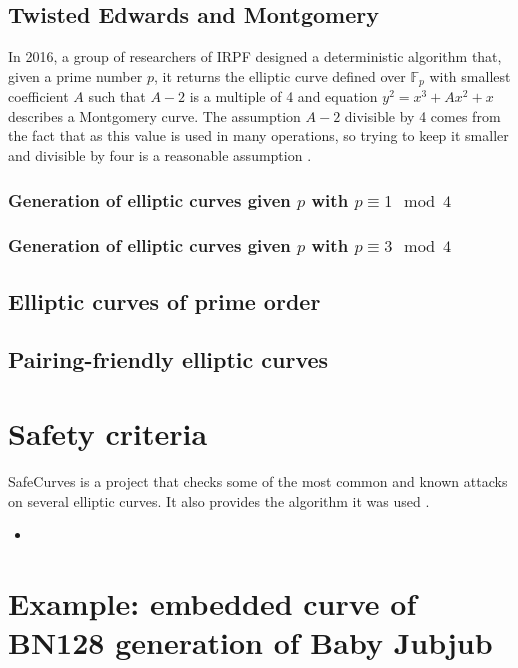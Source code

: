\documentclass{article}
\newcommand{\Fp}{\ensuremath{\mathbb{F}_p}}
\begin{document}
\begin{spacing}{1.2}
	\subsection{Twisted Edwards and Montgomery}
				
		In 2016, a group of researchers of IRPF designed a deterministic algorithm that, given a prime number $p$, it returns the elliptic curve defined over $\Fp$ with smallest coefficient $A$ such that $A-2$ is a multiple of 4 and equation $y^2 = x^3 + Ax^2 + x$ describes a Montgomery curve. 
		The assumption $A-2$ divisible by 4 comes from the fact that as this value is used in many operations, so trying to keep it smaller and divisible by four is a reasonable assumption \cite{generation-baby}.
		
		\subsubsection{Generation of elliptic curves given $p$ with $p\equiv1\mod4$} \vspace{0.5cm}
				
		\subsubsection{Generation of elliptic curves given $p$ with $p\equiv3\mod4$}
		
	\subsection{Elliptic curves of prime order}
	\subsection{Pairing-friendly elliptic curves}

\section{Safety criteria}
	SafeCurves is a project that checks some of the most common and known attacks on several elliptic curves. It also provides the algorithm it was used \cite{safe-curves}.
	
	\begin{itemize}
		\item 
	\end{itemize}

\section{Example: embedded curve of BN128 generation of Baby Jubjub}
	

\end{spacing}
\end{document}
